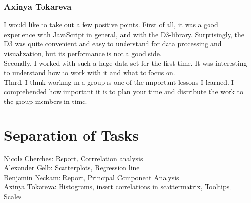 \documentclass{vgtc}                          %
\begin{document}
\subsubsection{Axinya Tokareva}
I would like to take out a few positive points. First of all, it was a good experience with JavaScript in general, and with the D3-library. Surprisingly, the D3 was quite convenient and easy to understand for data processing and visualization, but its performance is not a good side.\\
Secondly, I worked with such a huge data set for the first time. It was interesting to understand how to work with it and what to focus on.\\
Third, I think working in a group is one of the important lessons I learned. I comprehended how important it is to plan your time and distribute the work to the group members in time.
\section{Separation of Tasks}
Nicole Cherches: Report, Corrrelation analysis\\
Alexander Gelb: Scatterplots, Regression line\\
Benjamin Neckam: Report, Principal Component Analysis\\
Axinya Tokareva: Histograms, insert correlations in scattermatrix, Tooltips, Scales


\end{document}
